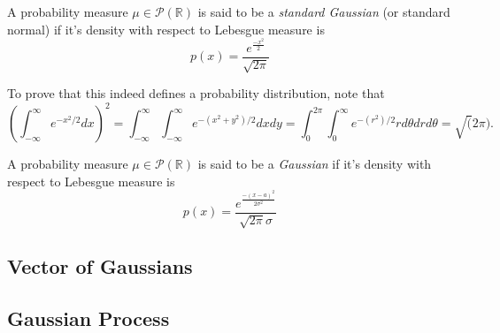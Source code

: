 \begin{definition}
	A probability measure $\mu \in \mathcal P(\mathbb R)$
	is said to be a \textit{standard Gaussian} (or standard normal)
	if it's density with respect to Lebesgue measure is
	\begin{equation}
		p(x) = \frac{e^{\frac{-x^2}{2}}}{\sqrt{2\pi}}
		\label{eq:gaussian}
	\end{equation}

	To prove that this indeed defines a probability distribution, note that
	\begin{displaymath}
		\left(\int_{-\infty}^\infty
		e^{-x^2/2} dx
		\right)^2 =
		\int_{-\infty}^\infty
		\int_{-\infty}^\infty
		e^{-(x^2+y^2)/2} dx dy
		=
		\int_{0}^{2\pi}
		\int_{0}^\infty
		e^{-(r^2)/2}r d\theta drd\theta = \sqrt(2\pi).
	\end{displaymath}
\end{definition}

\begin{definition}[Gaussian]
	A probability measure $\mu \in \mathcal P(\mathbb R)$
	is said to be a \textit{Gaussian}
	if it's density with respect to Lebesgue measure is
	\begin{equation}
		p(x) = \frac{e^{\frac{-(x-a)^2}{2\sigma^2}}}{\sqrt{2\pi}\sigma}
		\label{eq:gaussian}
	\end{equation}
\end{definition}


\subsection{Vector of Gaussians}

\subsection{Gaussian Process}

